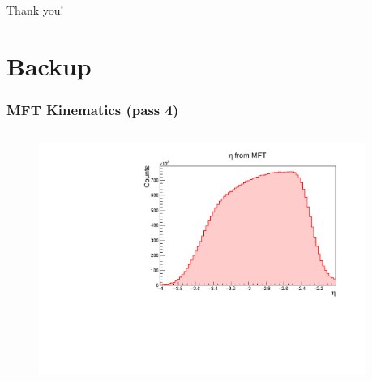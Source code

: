 \documentclass[10pt]{beamer}
\begin{document}
\begin{frame}
    \begin{center}
        {\Huge Thank you!}
    \end{center}

\end{frame}


\section{Backup}

\begin{frame}
    \frametitle{MFT Kinematics (pass 4)}

    \begin{columns}
        \begin{column}{0.5\textwidth}
            \vspace*{-0.43cm}
            \begin{figure}
                \begin{center}
                    \includegraphics[width=0.95\textwidth]{Plots/pass4_MFT/MFTeta_pass4.pdf}
                \end{center}
            \end{figure}
            \vspace*{-0.6cm}
            \begin{figure}
                \begin{center}

\end{center}
\end{figure}
\end{column}
\end{columns}
\end{frame}
\end{document}
